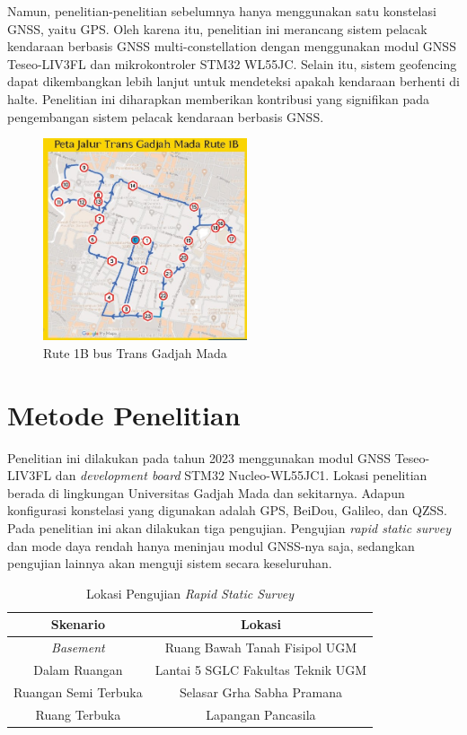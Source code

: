 \documentclass[conference]{IEEEtran}
\begin{document}
Namun, penelitian-penelitian sebelumnya hanya menggunakan satu konstelasi GNSS, yaitu GPS. Oleh karena itu, penelitian ini merancang sistem pelacak kendaraan berbasis GNSS multi-constellation dengan menggunakan modul GNSS Teseo-LIV3FL dan mikrokontroler STM32 WL55JC. Selain itu, sistem geofencing dapat dikembangkan lebih lanjut untuk mendeteksi apakah kendaraan berhenti di halte. Penelitian ini diharapkan memberikan kontribusi yang signifikan pada pengembangan sistem pelacak kendaraan berbasis GNSS.

\begin{figure}[H]
	\centering
	\includegraphics[width=6cm]{Peta-Jalur-Rute-1B.jpg}
	\caption{Rute 1B bus Trans Gadjah Mada}
	\label{Fig: tgm-1b}
\end{figure}

\section{Metode Penelitian}
Penelitian ini dilakukan pada tahun 2023 menggunakan modul GNSS Teseo-LIV3FL dan \textit{development board} STM32 Nucleo-WL55JC1. Lokasi penelitian berada di lingkungan Universitas Gadjah Mada dan sekitarnya. Adapun konfigurasi konstelasi yang digunakan adalah GPS, BeiDou, Galileo, dan QZSS. Pada penelitian ini akan dilakukan tiga pengujian. Pengujian \textit{rapid static survey} dan mode daya rendah hanya meninjau modul GNSS-nya saja, sedangkan pengujian lainnya akan menguji sistem secara keseluruhan.

\begin{table}[htb!]
	\caption{Lokasi Pengujian \textit{Rapid Static Survey}}
	\centering
	\renewcommand{\arraystretch}{1.5}
	\begin{tabular}{cc}
		\hline
		\textbf{Skenario} & \textbf{Lokasi} \\\hline
		\textit{Basement} &Ruang Bawah Tanah Fisipol UGM\\
		Dalam Ruangan & Lantai 5 SGLC Fakultas Teknik UGM\\
		Ruangan Semi Terbuka &  Selasar Grha Sabha Pramana\\
		Ruang Terbuka & Lapangan Pancasila\\
		\hline
	\end{tabular}
	\label{tab: 3-rss-location}
\end{table}
\end{document}
